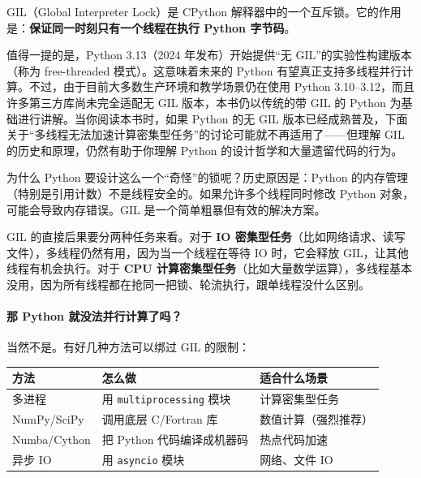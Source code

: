 \begin{definition}
GIL（Global Interpreter Lock）是 CPython 解释器中的一个互斥锁。它的作用是：\textbf{保证同一时刻只有一个线程在执行 Python 字节码}。
\end{definition}

\begin{remark}
值得一提的是，Python 3.13（2024 年发布）开始提供“无 GIL”的实验性构建版本（称为 free-threaded 模式）。这意味着未来的 Python 有望真正支持多线程并行计算。不过，由于目前大多数生产环境和教学场景仍在使用 Python 3.10--3.12，而且许多第三方库尚未完全适配无 GIL 版本，本书仍以传统的带 GIL 的 Python 为基础进行讲解。当你阅读本书时，如果 Python 的无 GIL 版本已经成熟普及，下面关于“多线程无法加速计算密集型任务”的讨论可能就不再适用了——但理解 GIL 的历史和原理，仍然有助于你理解 Python 的设计哲学和大量遗留代码的行为。
\end{remark}

为什么 Python 要设计这么一个“奇怪”的锁呢？历史原因是：Python 的内存管理（特别是引用计数）不是线程安全的。如果允许多个线程同时修改 Python 对象，可能会导致内存错误。GIL 是一个简单粗暴但有效的解决方案。

GIL 的直接后果要分两种任务来看。对于 \textbf{IO 密集型任务}（比如网络请求、读写文件），多线程仍然有用，因为当一个线程在等待 IO 时，它会释放 GIL，让其他线程有机会执行。对于 \textbf{CPU 计算密集型任务}（比如大量数学运算），多线程基本没用，因为所有线程都在抢同一把锁、轮流执行，跟单线程没什么区别。

\paragraph{那 Python 就没法并行计算了吗？}

当然不是。有好几种方法可以绑过 GIL 的限制：

\begin{center}
\renewcommand{\arraystretch}{1.3}
\begin{tabular}{l|l|l}
\toprule
\textbf{方法} & \textbf{怎么做} & \textbf{适合什么场景} \\
\midrule
多进程 & 用 \verb|multiprocessing| 模块 & 计算密集型任务 \\
NumPy/SciPy & 调用底层 C/Fortran 库 & 数值计算（强烈推荐） \\
Numba/Cython & 把 Python 代码编译成机器码 & 热点代码加速 \\
异步 IO & 用 \verb|asyncio| 模块 & 网络、文件 IO \\
\bottomrule
\end{tabular}
\end{center}

